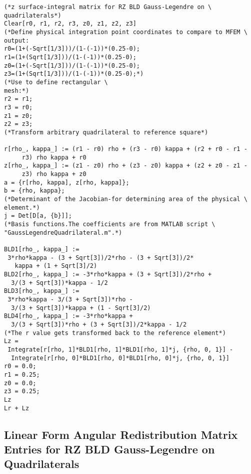 \documentclass{article}
\begin{document}
\begin{verbatim}
(*z surface-integral matrix for RZ BLD Gauss-Legendre on \
quadrilaterals*)
Clear[r0, r1, r2, r3, z0, z1, z2, z3]
(*Define physical integration point coordinates to compare to MFEM \
output:
r0=(1+(-Sqrt[1/3]))/(1-(-1))*(0.25-0);
r1=(1+(Sqrt[1/3]))/(1-(-1))*(0.25-0);
z0=(1+(-Sqrt[1/3]))/(1-(-1))*(0.25-0);
z3=(1+(Sqrt[1/3]))/(1-(-1))*(0.25-0);*)
(*Use to define rectangular \
mesh:*)
r2 = r1;
r3 = r0;
z1 = z0;
z2 = z3;
(*Transform arbitrary quadrilateral to reference square*)

r[rho_, kappa_] := (r1 - r0) rho + (r3 - r0) kappa + (r2 + r0 - r1 - 
     r3) rho kappa + r0
z[rho_, kappa_] := (z1 - z0) rho + (z3 - z0) kappa + (z2 + z0 - z1 - 
     z3) rho kappa + z0
a = {r[rho, kappa], z[rho, kappa]};
b = {rho, kappa};
(*Determinant of the Jacobian-for determining area of the physical \
element.*)
j = Det[D[a, {b}]];
(*Basis functions.The coefficients are from MATLAB script \
"GaussLegendreQuadrilateral.m".*)

BLD1[rho_, kappa_] := 
 3*rho*kappa - (3 + Sqrt[3])/2*rho - (3 + Sqrt[3])/2*
   kappa + (1 + Sqrt[3]/2)
BLD2[rho_, kappa_] := -3*rho*kappa + (3 + Sqrt[3])/2*rho + 
  3/(3 + Sqrt[3])*kappa - 1/2
BLD3[rho_, kappa_] := 
 3*rho*kappa - 3/(3 + Sqrt[3])*rho - 
  3/(3 + Sqrt[3])*kappa + (1 - Sqrt[3]/2)
BLD4[rho_, kappa_] := -3*rho*kappa + 
  3/(3 + Sqrt[3])*rho + (3 + Sqrt[3])/2*kappa - 1/2
(*The r value gets transformed back to the reference element*)
Lz = 
 Integrate[r[rho, 1]*BLD1[rho, 1]*BLD1[rho, 1]*j, {rho, 0, 1}] - 
  Integrate[r[rho, 0]*BLD1[rho, 0]*BLD1[rho, 0]*j, {rho, 0, 1}]
r0 = 0.0;
r1 = 0.25;
z0 = 0.0;
z3 = 0.25;
Lz
Lr + Lz
\end{verbatim}

\subsection{Linear Form Angular Redistribution Matrix Entries for RZ BLD Gauss-Legendre on Quadrilaterals}
\end{document}
